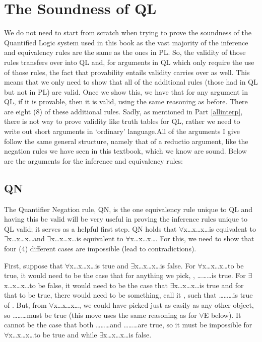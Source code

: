 \section{The Soundness of QL}
We do not need to start from scratch when trying to prove the soundness of the Quantified Logic system used in this book as the vast majority of the inference and equivalency rules are the same as the ones in PL. So, the validity of those rules transfers over into QL and, for arguments in QL which only require the use of those rules, the fact that provability entails validity carries over as well. This means that we only need to show that all of the additional rules (those had in QL but not in PL) are valid. Once we show this, we have that for any argument in QL, if it is provable, then it is valid, using the same reasoning as before.  There are eight (8) of these additional rules. Sadly, as mentioned in Part \ref{allinterp}, there is not way to prove validity like truth tables for QL, rather we need to write out short arguments in `ordinary' language.All of the arguments I give follow the same general structure, namely that of a reductio argument, like the negation rules we have seen in this textbook, which we know are sound. Below are the arguments for the inference and equivalency rules:

\subsection{QN}
The Quantifier Negation rule, QN, is the one equivalency rule unique to QL and having this be valid will be very useful in proving the inference rules unique to QL valid; it serves as a helpful first step. QN holds that $\forall$x\enot{}\ldots x\ldots x\ldots is equivalent to \enot$\exists$x\ldots x\ldots x\ldots and $\exists$x\enot{}\ldots x\ldots x\ldots is equivalent to \enot$\forall$x\ldots x\ldots x\ldots. For this, we need to show that four (4) different cases are impossible (lead to contradictions).

First, suppose that $\forall$x\enot{}\ldots x\ldots x\ldots is true and \enot$\exists$x\ldots x\ldots x\ldots is false. For $\forall$x\enot{}\ldots x\ldots x\ldots  to be true, it would need to be the case that for anything we pick, , \enot{}\ldots {}\ldots{}\ldots is true. For \enot$\exists$x\ldots x\ldots x\ldots to be false, it would need to be the case that $\exists$x\ldots x\ldots x\ldots is true and for that to be true, there would need to be something, call it , such that \ldots{}\ldots{}\ldots is true of . But, from $\forall$x\enot{}\ldots x\ldots x\ldots, we could have picked  just as easily as any other object, so \enot{}\ldots{}\ldots{}\ldots must be true (this move uses the same reasoning as for $\forall$E below). It cannot be the case that  both \enot{}\ldots{}\ldots{}\ldots and \ldots{}\ldots{}\ldots are true, so it must be impossible for $\forall$x\enot{}\ldots x\ldots x\ldots to be true and while \enot$\exists$x\ldots x\ldots x\ldots is false.

